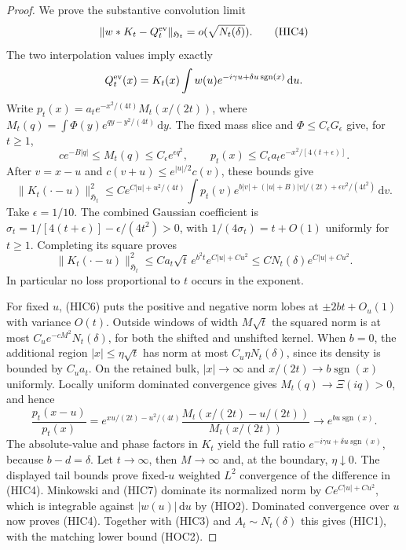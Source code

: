 \documentclass[11pt]{article}
\theoremstyle{remark}\newtheorem{remark}[theorem]{Remark}
\newcommand{\dd}{\,\mathrm d}
\begin{document}
\begin{proof}
We prove the substantive convolution limit
\[
 \|w*K_t-Q_t^{\rm ev}\|_{\mathfrak H_t}
                                  =o(\sqrt{N_t(\delta)}).     \tag{HIC4}
\]
The two interpolation values imply exactly
\[
 Q_t^{\rm ev}(x)=K_t(x)
            \int w(u)e^{-i\gamma u+\delta u\operatorname{sgn}(x)}\dd u.
\]
Write
$p_t(x)=a_te^{-x^2/(4t)}M_t(x/(2t))$, where
$M_t(q)=\int\Phi(y)e^{qy-y^2/(4t)}\dd y$.
The fixed mass slice and $\Phi\le C_\epsilon G_\epsilon$ give,
for $t\ge1$,
\[
 ce^{-B|q|}\le M_t(q)\le C_\epsilon e^{\epsilon q^2},\qquad
 p_t(x)\le C_\epsilon a_te^{-x^2/[4(t+\epsilon)]}.              \tag{HIC5}
\]
After $v=x-u$ and $c(v+u)\le e^{|u|/2}c(v)$, these bounds give
\[
 \|K_t(\cdot-u)\|_{\mathfrak H_t}^2
 \le Ce^{C|u|+u^2/(4t)}\int p_t(v)
   e^{b|v|+(|u|+B)|v|/(2t)+\epsilon v^2/(4t^2)}\dd v.
                                                               \tag{HIC6}
\]
Take $\epsilon=1/10$. The combined Gaussian coefficient is
$\sigma_t=1/[4(t+\epsilon)]-\epsilon/(4t^2)>0$, with
$1/(4\sigma_t)=t+O(1)$ uniformly for $t\ge1$.
Completing its square proves
\[
 \|K_t(\cdot-u)\|_{\mathfrak H_t}^2
      \le Ca_t\sqrt t\,e^{b^2t}e^{C|u|+Cu^2}
      \le CN_t(\delta)e^{C|u|+Cu^2}.                         \tag{HIC7}
\]
In particular no loss proportional to $t$ occurs in the exponent.

For fixed $u$, (HIC6) puts the positive and negative norm lobes
at $\pm2bt+O_u(1)$ with variance $O(t)$. Outside windows of width
$M\sqrt t$ the squared norm is at most
$C_ue^{-cM^2}N_t(\delta)$, for both the shifted and unshifted kernel.
When $b=0$, the additional region $|x|\le\eta\sqrt t$ has norm at
most $C_u\eta N_t(\delta)$, since its density is bounded by $C_ua_t$.
On the retained bulk, $|x|\to\infty$ and
$x/(2t)\to b\operatorname{sgn}(x)$ uniformly.
Locally uniform dominated convergence gives $M_t(q)\to\Xi(iq)>0$,
and hence
\[
 \frac{p_t(x-u)}{p_t(x)}
 =e^{xu/(2t)-u^2/(4t)}
              \frac{M_t(x/(2t)-u/(2t))}{M_t(x/(2t))}
 \longrightarrow e^{bu\operatorname{sgn}(x)}.
\]
The absolute-value and phase factors in $K_t$ yield the full ratio
$e^{-i\gamma u+\delta u\operatorname{sgn}(x)}$, because $b-d=\delta$.
Let $t\to\infty$, then $M\to\infty$ and, at the boundary,
$\eta\downarrow0$. The displayed tail bounds prove fixed-$u$
weighted $L^2$ convergence of the difference in (HIC4).
Minkowski and (HIC7) dominate its normalized norm by
$Ce^{C|u|+Cu^2}$, which is integrable against $|w(u)|\dd u$ by (HIO2).
Dominated convergence over $u$ now proves (HIC4).
Together with (HIC3) and $A_t\sim N_t(\delta)$ this gives (HIC1),
with the matching lower bound (HOC2).


\end{proof}
\end{document}
